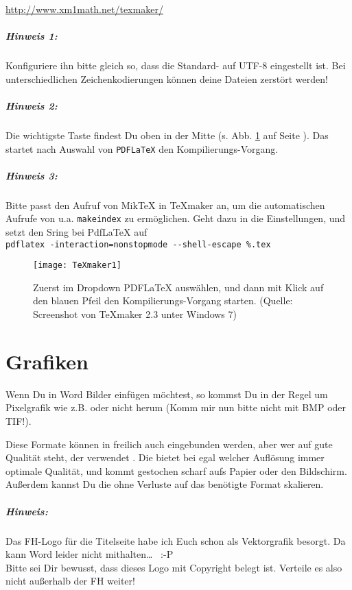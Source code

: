\url{http://www.xm1math.net/texmaker/}

\subparagraph*{Hinweis 1:} Konfiguriere ihn bitte gleich so, dass die Standard- auf UTF-8 eingestellt ist. Bei unterschiedlichen Zeichenkodierungen können deine Dateien zerstört werden!
\subparagraph*{Hinweis 2:} Die wichtigste Taste findest Du oben in der Mitte (s. Abb. \ref{fig:texmakerstart} auf Seite \pageref{fig:texmakerstart}). Das startet nach Auswahl von \texttt{PDFLaTeX} den Kompilierungs-Vorgang.
\subparagraph*{Hinweis 3:} Bitte passt den Aufruf von MikTeX in TeXmaker an, um die automatischen Aufrufe von u.a. \verb|makeindex| zu ermöglichen. Geht dazu in die Einstellungen, und setzt den \label{lab:shellescape}
Sring bei PdfLaTeX auf \\
 \verb|pdflatex -interaction=nonstopmode --shell-escape %.tex|

\bigskip
\begin{figure}[h!] %
	\texttt{[image: TeXmaker1]} 		%
	\caption[Dieser Text erscheint nur im Verzeichnis]%
			{Zuerst im Dropdown PDFLaTeX auswählen, und dann mit Klick auf den blauen Pfeil den Kompilierungs-Vorgang starten. (Quelle: Screenshot von TeXmaker 2.3 unter Windows 7)}
  	\label{fig:texmakerstart}
\end{figure}
\bigskip




\section*{Grafiken}
\label{sec:Grafiken}
Wenn Du in Word Bilder einfügen möchtest, so kommst Du in der Regel um Pixelgrafik wie z.B.  oder  nicht herum (Komm mir nun bitte nicht mit BMP oder TIF!). 

Diese Formate können in \latex freilich auch eingebunden werden, aber wer auf gute Qualität steht, der verwendet . Die bietet bei egal welcher Auflösung immer optimale Qualität, und kommt gestochen scharf aufs Papier oder den Bildschirm. Außerdem kannst Du die ohne Verluste auf das benötigte Format skalieren. 

\subparagraph*{Hinweis:} Das FH-Logo für die Titelseite habe ich Euch schon als Vektorgrafik besorgt. Da kann Word leider nicht mithalten…  ~:-P \\
Bitte sei Dir bewusst, dass dieses Logo mit Copyright belegt ist. Verteile es also nicht außerhalb der FH weiter!



